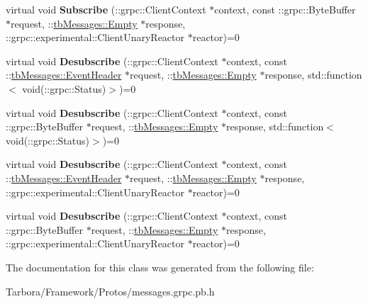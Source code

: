 \begin{DoxyCompactItemize}
\item 
\mbox{\label{classtbMessages_1_1TarboraMessages_1_1StubInterface_1_1experimental__async__interface_ad000e7f4af4d7bdc591fb12efe2a4f6a}} 
virtual void {\bfseries Subscribe} (\+::grpc\+::\+Client\+Context $\ast$context, const \+::grpc\+::\+Byte\+Buffer $\ast$request, \+::\hyperlink{classtbMessages_1_1Empty}{tb\+Messages\+::\+Empty} $\ast$response, \+::grpc\+::experimental\+::\+Client\+Unary\+Reactor $\ast$reactor)=0
\item 
\mbox{\label{classtbMessages_1_1TarboraMessages_1_1StubInterface_1_1experimental__async__interface_a65bd355f46f85a8ad505e8e1d9361596}} 
virtual void {\bfseries Desubscribe} (\+::grpc\+::\+Client\+Context $\ast$context, const \+::\hyperlink{classtbMessages_1_1EventHeader}{tb\+Messages\+::\+Event\+Header} $\ast$request, \+::\hyperlink{classtbMessages_1_1Empty}{tb\+Messages\+::\+Empty} $\ast$response, std\+::function$<$ void(\+::grpc\+::\+Status)$>$)=0
\item 
\mbox{\label{classtbMessages_1_1TarboraMessages_1_1StubInterface_1_1experimental__async__interface_a6063d57e55c61bdaf66959ebcba02ddc}} 
virtual void {\bfseries Desubscribe} (\+::grpc\+::\+Client\+Context $\ast$context, const \+::grpc\+::\+Byte\+Buffer $\ast$request, \+::\hyperlink{classtbMessages_1_1Empty}{tb\+Messages\+::\+Empty} $\ast$response, std\+::function$<$ void(\+::grpc\+::\+Status)$>$)=0
\item 
\mbox{\label{classtbMessages_1_1TarboraMessages_1_1StubInterface_1_1experimental__async__interface_ad459837fd2285354f3713bb5ad647978}} 
virtual void {\bfseries Desubscribe} (\+::grpc\+::\+Client\+Context $\ast$context, const \+::\hyperlink{classtbMessages_1_1EventHeader}{tb\+Messages\+::\+Event\+Header} $\ast$request, \+::\hyperlink{classtbMessages_1_1Empty}{tb\+Messages\+::\+Empty} $\ast$response, \+::grpc\+::experimental\+::\+Client\+Unary\+Reactor $\ast$reactor)=0
\item 
\mbox{\label{classtbMessages_1_1TarboraMessages_1_1StubInterface_1_1experimental__async__interface_a7c039addb9dad0c7302d81347bffc219}} 
virtual void {\bfseries Desubscribe} (\+::grpc\+::\+Client\+Context $\ast$context, const \+::grpc\+::\+Byte\+Buffer $\ast$request, \+::\hyperlink{classtbMessages_1_1Empty}{tb\+Messages\+::\+Empty} $\ast$response, \+::grpc\+::experimental\+::\+Client\+Unary\+Reactor $\ast$reactor)=0
\end{DoxyCompactItemize}


The documentation for this class was generated from the following file\+:\begin{DoxyCompactItemize}
\item 
Tarbora/\+Framework/\+Protos/messages.\+grpc.\+pb.\+h\end{DoxyCompactItemize}
